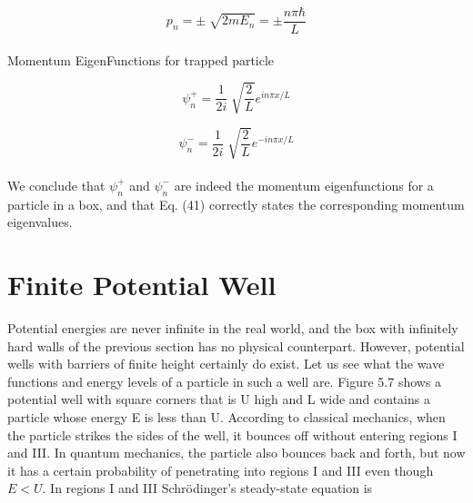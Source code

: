 \documentclass{article}
\begin{document}
\begin{equation}
    p_n=\pm\sqrt[]{2mE_n}=\pm\frac{n\pi\hbar}{L}
\end{equation}
\\
Momentum EigenFunctions for trapped particle


\begin{equation}
    \psi_n^+=\frac{1}{2i}\sqrt[]{\frac{2}{L}}e^{in\pi x/L}
\end{equation}

\begin{equation}
    \psi_n^-=\frac{1}{2i}\sqrt[]{\frac{2}{L}}e^{-in\pi x/L}
\end{equation}
\\
We conclude that $\psi_n^+$ and $\psi_n^-$ are indeed the momentum eigenfunctions for a particle in a box, and that Eq. (41) correctly states the corresponding momentum
eigenvalues.

\section*{Finite Potential Well}

Potential energies are never infinite in the real world, and the box with infinitely hard
walls of the previous section has no physical counterpart. However, potential wells
with barriers of finite height certainly do exist. Let us see what the wave functions and
energy levels of a particle in such a well are.
Figure 5.7 shows a potential well with square corners that is U high and L wide
and contains a particle whose energy E is less than U. According to classical
mechanics, when the particle strikes the sides of the well, it bounces off without
entering regions I and III. In quantum mechanics, the particle also bounces back
and forth, but now it has a certain probability of penetrating into regions I and III
even though $E<U$.
In regions I and III Schrödinger’s steady-state equation is
\end{document}
